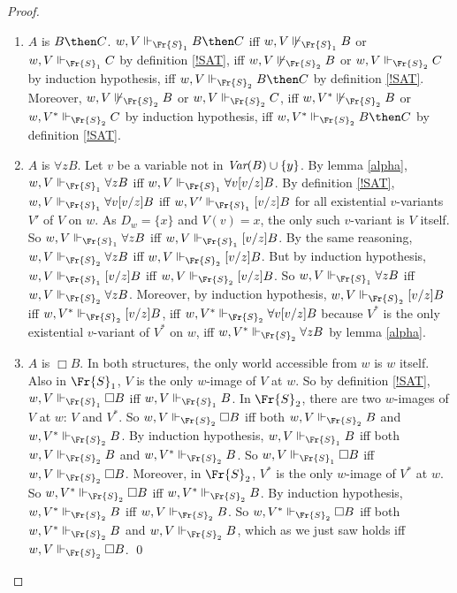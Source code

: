 \documentclass[11pt]{woarticle}
\newcommand{\cmnt}[1]{\iffalse #1 \fi}
\theoremstyle{break}
\theoremstyle{nonumberplain}
\newcommand{\SAT}{\Vdash}
\newcommand{\1}{\;\,|\;\,}
\newcommand{\var}{\emph{Var}}
\begin{document}
\begin{proof}
\begin{enumerate}
  \item $A$ is $B \then C$.\; $w,V \SAT_{\Fr{S}_1} B \then C$ iff $w,V
    \not\SAT_{\Fr{S}_1} B$ or $w,V \SAT_{\Fr{S}_1} C$ by definition
    \ref{!SAT}, iff $w,V \not\SAT_{\Fr{S}_2} B$ or $w,V
    \SAT_{\Fr{S}_2} C$ by induction hypothesis, iff $w,V
    \SAT_{\Fr{S}_2} B \then C$ by definition \ref{!SAT}. Moreover,
    $w,V \not\SAT_{\Fr{S}_2} B$ or $w,V \SAT_{\Fr{S}_2} C$, iff $w,V^*
    \not\SAT_{\Fr{S}_2} B$ or $w,V^* \SAT_{\Fr{S}_2} C$ by induction
    hypothesis, iff $w,V^* \SAT_{\Fr{S}_2} B \then C$ by definition
    \ref{!SAT}.
        
  \item $A$ is $\forall z B$.\; Let $v$ be a variable not in $\var(B)
    \cup \{ y \}$. By lemma \ref{alpha}, $w,V \SAT_{\Fr{S}_1} \forall
    z B$ iff $w,V \SAT_{\Fr{S}_1} \forall v [v/z]B$. By definition
    \ref{!SAT}, $w,V \SAT_{\Fr{S}_1} \forall v [v/z]B$ iff $w,V'
    \SAT_{\Fr{S}_1} [v/z]B$ for all existential $v$-variants $V'$ of
    $V$ on $w$. As $D_w = \{ x\}$ and $V(v)=x$, the only such
    $v$-variant is $V$ itself. So $w,V \SAT_{\Fr{S}_1} \forall z B$
    iff $w,V \SAT_{\Fr{S}_1} [v/z]B$. \cmnt{(Without the detour
      through $v$, the bound variable $z$ could have been $y$, in
      which case $V$ itself would not be the relevant $z$-variant
      $V'$.)} By the same reasoning, $w,V \SAT_{\Fr{S}_2} \forall z B$
    iff $w,V \SAT_{\Fr{S}_2} [v/z]B$. But by induction hypothesis,
    $w,V \SAT_{\Fr{S}_1} [v/z]B$ iff $w,V \SAT_{\Fr{S}_2} [v/z]B$. So
    $w,V \SAT_{\Fr{S}_1} \forall z B$ iff $w,V \SAT_{\Fr{S}_2}
    \forall z B$.  Moreover, by induction hypothesis, $w,V
    \SAT_{\Fr{S}_2} [v/z]B$ iff $w,V^* \SAT_{\Fr{S}_2} [v/z]B$, iff
    $w,V^* \SAT_{\Fr{S}_2} \forall v[v/z] B$ because $V^*$ is the only
    existential $v$-variant of $V^*$ on $w$, iff $w,V^* \SAT_{\Fr{S}_2}
    \forall z B$ by lemma \ref{alpha}.

  \item $A$ is $\Box B$.\; In both structures, the only world
    accessible from $w$ is $w$ itself. Also in $\Fr{S}_1$, $V$ is the
    only $w$-image of $V$ at $w$. So by definition \ref{!SAT}, $w,V
    \SAT_{\Fr{S}_1} \Box B$ iff $w,V \SAT_{\Fr{S}_1} B$. In
    $\Fr{S}_2$, there are two $w$-images of $V$ at $w$: $V$ and
    $V^*$. So $w,V \SAT_{\Fr{S}_2} \Box B$ iff both $w,V
    \SAT_{\Fr{S}_2} B$ and $w,V^* \SAT_{\Fr{S}_2} B$. By induction
    hypothesis, $w,V \SAT_{\Fr{S}_1} B$ iff both $w,V \SAT_{\Fr{S}_2}
    B$ and $w,V^* \SAT_{\Fr{S}_2} B$. So $w,V \SAT_{\Fr{S}_1} \Box B$
    iff $w,V \SAT_{\Fr{S}_2} \Box B$.  Moreover, in $\Fr{S}_2$, $V^*$
    is the only $w$-image of $V^*$ at $w$. So $w,V^* \SAT_{\Fr{S}_2}
    \Box B$ iff $w,V^* \SAT_{\Fr{S}_2} B$. By induction hypothesis,
    $w,V^* \SAT_{\Fr{S}_2} B$ iff $w,V \SAT_{\Fr{S}_2} B$. So $w,V^*
    \SAT_{\Fr{S}_2} \Box B$ iff both $w,V^* \SAT_{\Fr{S}_2} B$ and
    $w,V \SAT_{\Fr{S}_2} B$, which as we just saw holds iff $w,V
    \SAT_{\Fr{S}_2} \Box B$. \qed
  \end{enumerate}
\end{proof}
\end{document}

